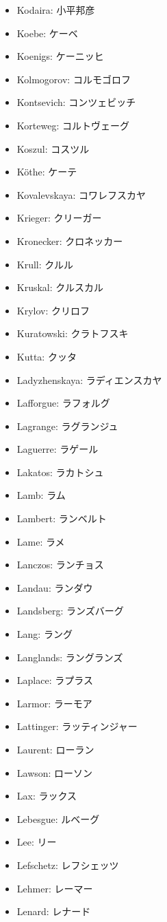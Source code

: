 \documentclass[openany, a4paper, oneside]{jsbook}
\begin{document}
\begin{itemize}
\item Kodaira: 小平邦彦
\item Koebe: ケーベ
\item Koenigs: ケーニッヒ
\item Kolmogorov: コルモゴロフ
\item Kontsevich: コンツェビッチ
\item Korteweg: コルトヴェーグ
\item Koszul: コスツル
\item K\"othe: ケーテ
\item Kovalevskaya: コワレフスカヤ
\item Krieger: クリーガー
\item Kronecker: クロネッカー
\item Krull: クルル
\item Kruskal: クルスカル
\item Krylov: クリロフ
\item Kuratowski: クラトフスキ
\item Kutta: クッタ
\item Ladyzhenskaya: ラディエンスカヤ
\item Lafforgue: ラフォルグ
\item Lagrange: ラグランジュ
\item Laguerre: ラゲール
\item Lakatos: ラカトシュ
\item Lamb: ラム
\item Lambert: ランベルト
\item Lame: ラメ
\item Lanczos: ランチョス
\item Landau: ランダウ
\item Landsberg: ランズバーグ
\item Lang: ラング
\item Langlands: ラングランズ
\item Laplace: ラプラス
\item Larmor: ラーモア
\item Lattinger: ラッティンジャー
\item Laurent: ローラン
\item Lawson: ローソン
\item Lax: ラックス
\item Lebesgue: ルベーグ
\item Lee: リー
\item Lefschetz: レフシェッツ
\item Lehmer: レーマー
\item Lenard: レナード

\end{itemize}
\end{document}
